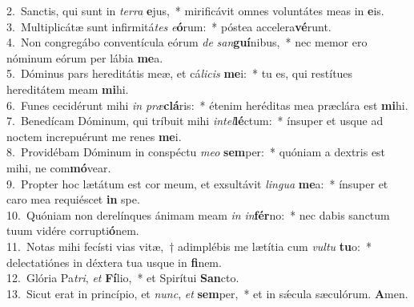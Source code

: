 {2.~}Sanctis, qui sunt in \textit{ter}\textit{ra} \textbf{e}jus,~* mirificávit omnes voluntátes meas in \textbf{e}is.\\
{3.~}Multiplicátæ sunt infirmitá\textit{tes} \textit{e}\textbf{ó}rum:~* póstea accelera\textbf{vé}runt.\\
{4.~}Non congregábo conventícula eórum \textit{de} \textit{san}\textbf{guí}nibus,~* nec memor ero nóminum eórum per lábia \textbf{me}a.\\
{5.~}Dóminus pars hereditátis meæ, et cá\textit{li}\textit{cis} \textbf{me}i:~* tu es, qui restítues hereditátem meam \textbf{mi}hi.\\
{6.~}Funes cecidérunt mihi \textit{in} \textit{præ}\textbf{clá}ris:~* étenim heréditas mea præclára est \textbf{mi}hi.\\
{7.~}Benedícam Dóminum, qui tríbuit mihi \textit{in}\textit{tel}\textbf{lé}ctum:~* ínsuper et usque ad noctem increpuérunt me renes \textbf{me}i.\\
{8.~}Providébam Dóminum in conspéctu \textit{me}\textit{o} \textbf{sem}per:~* quóniam a dextris est mihi, ne com\textbf{mó}vear.\\
{9.~}Propter hoc lætátum est cor meum, et exsultávit \textit{lin}\textit{gua} \textbf{me}a:~* ínsuper et caro mea requiéscet \textbf{in} spe.\\
{10.~}Quóniam non derelínques ánimam meam \textit{in} \textit{in}\textbf{fér}no:~* nec dabis sanctum tuum vidére corrupti\textbf{ó}nem.\\
{11.~}Notas mihi fecísti vias vitæ,~† adimplébis me lætítia cum \textit{vul}\textit{tu} \textbf{tu}o:~* delectatiónes in déxtera tua usque in \textbf{fi}nem.\\
{12.~}Glória Pa\textit{tri}, \textit{et} \textbf{Fí}lio,~* et Spirítui \textbf{San}cto.\\
{13.~}Sicut erat in princípio, et \textit{nunc}, \textit{et} \textbf{sem}per,~* et in sǽcula sæculórum. \textbf{A}men.\\
